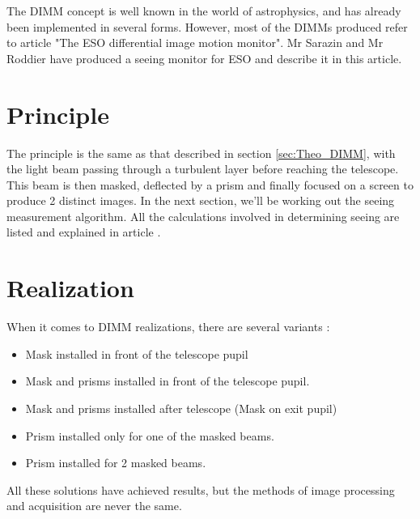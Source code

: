 The \Gls{DIMM} concept is well known in the world of astrophysics, and has already been implemented in several forms.
However, most of the \Gls{DIMM}s produced refer to article "The ESO differential image motion monitor". 
Mr Sarazin and Mr Roddier have produced 
a seeing monitor for ESO and describe it in this article.

\section{Principle}
The principle is the same as that described in section \ref{sec:Theo_DIMM}, with the light beam passing through a turbulent layer 
before reaching the telescope. This beam is then masked, deflected by a prism and finally focused on a screen to produce 
2 distinct images. In the next section, we'll be working out the seeing measurement algorithm. All the calculations involved 
in determining seeing are listed and explained in article \cite{DIMM_ESO}.
\section{Realization}
When it comes to \Gls{DIMM} realizations, there are several variants :
\begin{itemize}
    \item Mask installed in front of the telescope pupil
    \item Mask and prisms installed in front of the telescope pupil.
    \item Mask and prisms installed after telescope (Mask on exit pupil)
    \item Prism installed only for one of the masked beams.
    \item Prism installed for 2 masked beams.
\end{itemize}
All these solutions have achieved results, but the methods of image processing and acquisition are never the same.
\newpage
